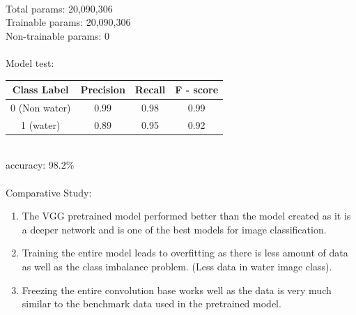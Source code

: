 \documentclass[12pt]{article}
\begin{document}
\begin{enumerate}
\begin{enumerate}
\\[0.5cm]
Total params: 20,090,306\\
Trainable params: 20,090,306\\
Non-trainable params: 0\\[1cm]\\
Model test:\\[0.5cm]
\begin{tabular}{|c|c|c|c|}
\hline
Class Label & Precision & Recall & F - score\\ \hline
0 (Non water) & 0.99  & 0.98 & 0.99\\ \hline
1 (water) & 0.89 & 0.95 & 0.92\\ \hline
\end{tabular}
\\
accuracy: 98.2\%\\[0.5cm]\\
Comparative Study:
\begin{enumerate}
\item The VGG pretrained model performed better than the model created as it is a deeper network and is one of the best models for image classification.
\item Training the entire model leads to overfitting as there is less amount of data as well as the class imbalance problem. (Less data in water image class).
\item Freezing the entire convolution base works well as the data is very much similar to the benchmark data used in the pretrained model.
\end{enumerate}
\end{enumerate}
\end{enumerate}
\end{document}
